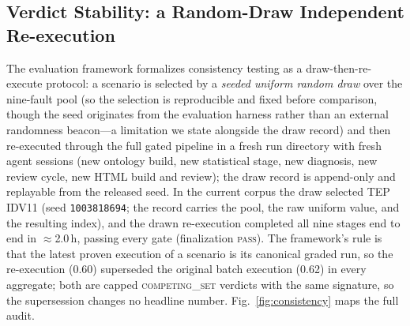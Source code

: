 \documentclass[preprint,12pt]{elsarticle}
\begin{document}
\subsection{Verdict Stability: a Random-Draw Independent Re-execution}\label{sec:stability}
The evaluation framework formalizes consistency testing as a draw-then-re-execute protocol: a scenario is selected by a \emph{seeded uniform random draw} over the nine-fault pool (so the selection is reproducible and fixed before comparison, though the seed originates from the evaluation harness rather than an external randomness beacon---a limitation we state alongside the draw record) and then re-executed through the full gated pipeline in a fresh run directory with fresh agent sessions (new ontology build, new statistical stage, new diagnosis, new review cycle, new HTML build and review); the draw record is append-only and replayable from the released seed. In the current corpus the draw selected TEP IDV11 (seed \texttt{1003818694}; the record carries the pool, the raw uniform value, and the resulting index), and the drawn re-execution completed all nine stages end to end in $\approx$2.0\,h, passing every gate (finalization \textsc{pass}). The framework's rule is that the latest proven execution of a scenario is its canonical graded run, so the re-execution (0.60) superseded the original batch execution (0.62) in every aggregate; both are capped \mbox{\textsc{competing\_set}} verdicts with the same signature, so the supersession changes no headline number. Fig.~\ref{fig:consistency} maps the full audit.
\end{document}
